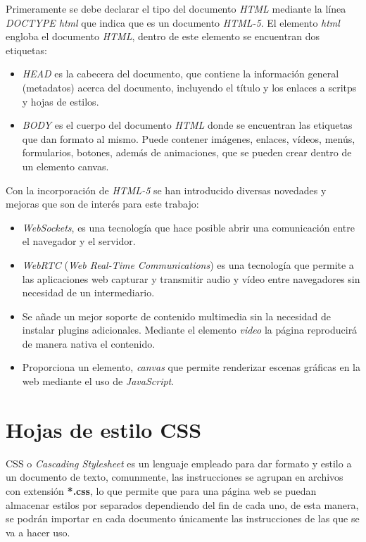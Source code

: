 \documentclass[a4paper, 12pt]{book}
\begin{document}
Primeramente se debe declarar el tipo del documento \textit{HTML} mediante la línea \textit{DOCTYPE html} que indica que es un documento \textit{HTML-5}. El elemento \textit{html} engloba el documento \textit{HTML}, dentro de este elemento se encuentran dos etiquetas:

\begin{itemize}
	\item \textit{HEAD} es la cabecera del documento, que contiene la información general (metadatos) acerca del documento, incluyendo el título y los enlaces a scritps y hojas de estilos.
	
	\item \textit{BODY} es el cuerpo del documento \textit{HTML} donde se encuentran las etiquetas que dan formato al mismo. Puede contener imágenes, enlaces, vídeos, menús, formularios, botones, además de animaciones, que se pueden crear dentro de un elemento canvas.
\end{itemize}

Con la incorporación de \textit{HTML-5} se han introducido diversas novedades y mejoras que son de interés para este trabajo:

\begin{itemize}
	\item \textit{WebSockets}, es una tecnología que hace posible abrir una comunicación entre el navegador y el servidor.
	
	\item \textit{WebRTC} (\textit{Web Real-Time Communications}) es una tecnología que permite a las aplicaciones web capturar y transmitir audio y vídeo entre navegadores sin necesidad de un intermediario.
	
	\item Se añade un mejor soporte de contenido multimedia sin la necesidad de instalar plugins adicionales. Mediante el elemento \textit{video} la página reproducirá de manera nativa el contenido.
	
	\item Proporciona un elemento, \textit{canvas} que permite renderizar escenas gráficas en la web mediante el uso de \textit{JavaScript}.
\end{itemize}

\section{Hojas de estilo CSS}
\label{sec:css}

CSS o \textit{Cascading Stylesheet} es un lenguaje empleado para dar formato y estilo a un documento de texto, comunmente, las instrucciones se agrupan en archivos con extensión \textbf{*.css}, lo que permite que para una página web se puedan almacenar estilos por separados dependiendo del fin de cada uno, de esta manera, se podrán importar en cada documento únicamente las instrucciones de las que se va a hacer uso.
\end{document}
